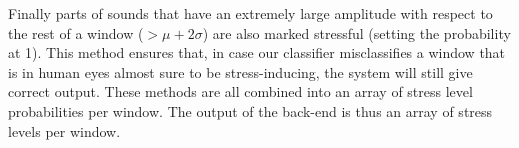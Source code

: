 Finally parts of sounds that have an extremely large amplitude with respect to the rest of a window ($>\mu + 2\sigma$) are also marked stressful (setting the probability at 1). This method ensures that, in case our classifier misclassifies a window that is in human eyes almost sure to be stress-inducing, the system will still give correct output. These methods are all combined into an array of stress level probabilities per window.  The output of the back-end is thus an array of stress levels per window.

